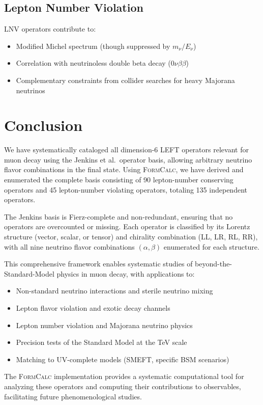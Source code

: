 \documentclass[11pt,a4paper]{article}
\newcommand{\formcalc}{\textsc{FormCalc}}
\begin{document}
\subsection{Lepton Number Violation}

LNV operators contribute to:
\begin{itemize}
\item Modified Michel spectrum (though suppressed by $m_\nu/E_\nu$)
\item Correlation with neutrinoless double beta decay ($0\nu\beta\beta$)
\item Complementary constraints from collider searches for heavy Majorana neutrinos
\end{itemize}

\section{Conclusion}

We have systematically cataloged all dimension-6 LEFT operators relevant for muon decay using the Jenkins et al.\ operator basis, allowing arbitrary neutrino flavor combinations in the final state. Using \formcalc{}, we have derived and enumerated the complete basis consisting of 90 lepton-number conserving operators and 45 lepton-number violating operators, totaling 135 independent operators.

The Jenkins basis is Fierz-complete and non-redundant, ensuring that no operators are overcounted or missing. Each operator is classified by its Lorentz structure (vector, scalar, or tensor) and chirality combination (LL, LR, RL, RR), with all nine neutrino flavor combinations $(\alpha, \beta)$ enumerated for each structure.

This comprehensive framework enables systematic studies of beyond-the-Standard-Model physics in muon decay, with applications to:
\begin{itemize}
\item Non-standard neutrino interactions and sterile neutrino mixing
\item Lepton flavor violation and exotic decay channels
\item Lepton number violation and Majorana neutrino physics
\item Precision tests of the Standard Model at the TeV scale
\item Matching to UV-complete models (SMEFT, specific BSM scenarios)
\end{itemize}

The \formcalc{} implementation provides a systematic computational tool for analyzing these operators and computing their contributions to observables, facilitating future phenomenological studies.
\end{document}
